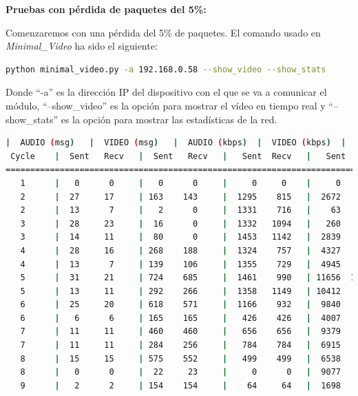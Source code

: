\textbf{Pruebas con pérdida de paquetes del 5\%:}
\vspace{\baselineskip}

Comenzaremos con una pérdida del 5\% de paquetes. El comando usado en \textit{Minimal\_Video} ha sido el siguiente:

\begin{lstlisting}[language=bash]
python minimal_video.py -a 192.168.0.58 --show_video --show_stats
\end{lstlisting}
Donde ``-a'' es la dirección IP del dispositivo con el que se va a comunicar el módulo, ``--show\_video'' es la opción para mostrar el vídeo en tiempo real y ``--show\_stats'' es la opción para mostrar las estadísticas de la red.
\vspace{\baselineskip}

\begin{lstlisting}[language=bash,basicstyle=\ttfamily\scriptsize]
          |  AUDIO (msg)   |  VIDEO (msg)   |  AUDIO (kbps)  |  VIDEO (kbps)  |   CPU (%)
 Cycle    |  Sent   Recv   |  Sent   Recv   |   Sent  Recv   |   Sent  Recv   | Program System
============================================================================================
   1      |   0      0     |   0      0     |     0     0    |     0     0    |   0      0
   2      |  27     17     | 163    143     |  1295    815   |  2672   2344   |  43     80
   2      |  13      7     |   2      0     |  1331    716   |    63      0   |  62     84
   3      |  28     23     |  16      0     |  1332   1094   |   260      0   |  30     86
   3      |  14     11     |  80      0     |  1453   1142   |  2839      0   |   6     87
   4      |  28     16     | 268    188     |  1324    757   |  4327   3037   |  36     81
   4      |  13      7     | 139    106     |  1355    729   |  4945   3776   |  44     82
   5      |  31     21     | 724    685     |  1461    990   | 11656  11025   |  15     85
   5      |  13     11     | 292    266     |  1358   1149   | 10412   9484   |  28     83
   6      |  25     20     | 618    571     |  1166    932   |  9840   9094   |  24     86
   6      |   6      6     | 165    165     |   426    426   |  4007   4007   |  41     67
   7      |  11     11     | 460    460     |   656    656   |  9379   9375   |  51     52
   7      |  11     11     | 284    256     |   784    784   |  6915   6237   |  43     78
   8      |  15     15     | 575    552     |   499    499   |  6538   6276   |  43     47
   8      |   0      0     |  22     23     |     0      0   |  9077   9489   |  73     35
   9      |   2      2     | 154    154     |    64     64   |  1698   1698   |  36      5

\end{lstlisting}
